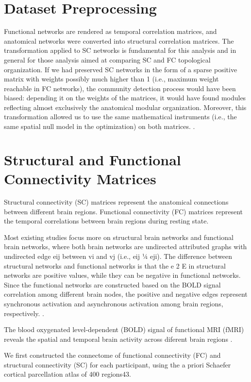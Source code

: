 
\section{Dataset Preprocessing}
Functional networks are rendered as temporal correlation matrices, and anatomical networks were converted into structural 
correlation matrices.
The transformation applied to SC networks is fundamental for this analysis and in general for those analysis aimed at 
comparing SC and FC topological organization. 
If we had preserved SC networks in the form of a sparse positive matrix with
weights possibly much higher than 1 (i.e., maximum weight reachable in FC networks), the community detection process would  
have been biased: depending it on the weights of the matrices, it would have found modules reflecting almost exclusively 
the anatomical modular organization.
Moreover, this transformation allowed us to use the same mathematical instruments (i.e., the same spatial null model in 
the optimization) on both matrices.
\cite{Puxeddu2022}.

\section{Structural and Functional Connectivity Matrices}
Structural connectivity (SC) matrices represent the anatomical connections between different brain regions.
Functional connectivity (FC) matrices represent the temporal correlations between brain regions during resting state.

Most existing studies focus more on structural brain networks 
and functional brain networks, where both brain networks are 
undirected attributed graphs with undirected edge eij between 
vi and vj (i.e., eij ¼ eji). The difference between structural
networks and functional networks is that the e 2 E in structural 
networks are positive values, while they can be negative in 
functional networks.
Since the functional networks are constructed based on the BOLD 
signal correlation among different brain nodes, the positive and 
negative edges represent synchronous activation and asynchronous 
activation among brain regions, respectively. \cite{Tang2023}.

The blood oxygenated level-dependent (BOLD) signal of functional MRI
(fMRI) reveals the spatial and temporal brain activity across diferent
brain regions \cite{Zhao2022}. 

We first constructed the connectome of functional connectivity (FC) 
and structural connectivity (SC) for each participant, using the a 
priori Schaefer cortical parcellation atlas of 400 regions43. 

